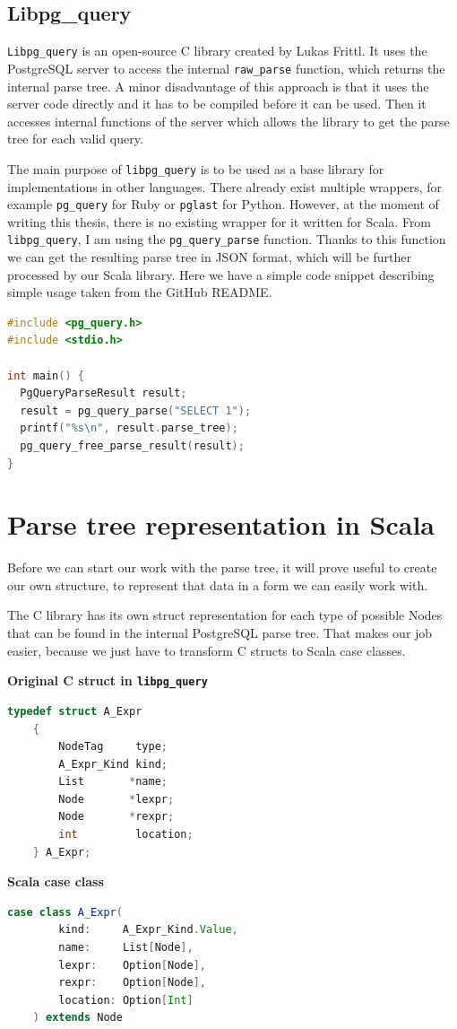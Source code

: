 \documentclass[thesis=B,english]{FITthesis}[2019/12/23]
\begin{document}
\subsection{Libpg\_query}
\texttt{Libpg\_query} is an open-source C library created by Lukas Frittl. It uses the PostgreSQL server to access the internal \texttt{raw\_parse} function, which returns the internal parse tree. A minor disadvantage of this approach is that it uses the server code directly and it has to be compiled before it can be used. Then it accesses internal functions of the server which allows the library to get the parse tree for each valid query.

The main purpose of \texttt{libpg\_query} is to be used as a base library for implementations in other languages. There already exist multiple wrappers, for example \texttt{pg\_query} for Ruby or \texttt{pglast} for Python. However, at the moment of writing this thesis, there is no existing wrapper for it written for Scala. From \texttt{libpg\_query}, I am using the \texttt{pg\_query\_parse} function. Thanks to this function we can get the resulting parse tree in JSON format, which will be further processed by our Scala library.
\newpage
Here we have a simple code snippet describing simple usage taken from the GitHub README\cite{libpgquery}. 

\begin{lstlisting}[language=c]
#include <pg_query.h>
#include <stdio.h>

int main() {
  PgQueryParseResult result;
  result = pg_query_parse("SELECT 1");
  printf("%s\n", result.parse_tree);
  pg_query_free_parse_result(result);
}
\end{lstlisting}

\section{Parse tree representation in Scala}
Before we can start our work with the parse tree, it will prove useful to create our own structure, to represent that data in a form we can easily work with. 

The C library has its own struct representation for each type of possible Nodes that can be found in the internal PostgreSQL parse tree. That makes our job easier, because we just have to transform C structs to Scala case classes.

\bigskip
\newline
\textbf{Original C struct in \texttt{libpg\_query}}
\begin{lstlisting}[language=c]
    typedef struct A_Expr
    {
        NodeTag     type;
        A_Expr_Kind kind;
        List       *name; 
        Node       *lexpr; 
        Node       *rexpr; 
        int         location; 
    } A_Expr;
\end{lstlisting}
\bigskip
\textbf{Scala case class}
\begin{lstlisting}[language=scala]
    case class A_Expr(
        kind:     A_Expr_Kind.Value,
        name:     List[Node],
        lexpr:    Option[Node],
        rexpr:    Option[Node],
        location: Option[Int]
    ) extends Node
\end{lstlisting}
\end{document}
